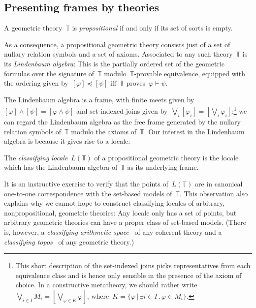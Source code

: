 \documentclass{ws-rv9x6}
\newcommand{\TT}{\mathbb{T}}
\renewcommand{\_}{\mathpunct{.}}
\newcommand{\?}{\,{:}\,}
\begin{document}
\subsection{Presenting frames by theories}
\label{sect:presenting-frames}

\begin{definition}A geometric theory~$\TT$ is \emph{propositional} if and only
if its set of sorts is empty.\end{definition}

As a consequence, a propositional geometric theory consists just of a set of
nullary relation symbols and a set of axioms. Associated to any such
theory~$\TT$ is its \emph{Lindenbaum algebra}: This is the partially ordered
set of the geometric formulas over the signature of~$\TT$ modulo~$\TT$-provable
equivalence, equipped with the ordering given by~$[\varphi] \preceq [\psi]$ iff~$\TT$
proves~$\varphi \vdash \psi$.

The Lindenbaum algebra is a frame, with finite meets given by~$[\varphi] \wedge
[\psi] = [\varphi \wedge \psi]$ and set-indexed joins given by~$\bigvee_i
[\varphi_i] = [\bigvee_i \varphi_i]$;\footnote{This short description of the
set-indexed joins picks representatives from each equivalence class and is
hence only sensible in the presence of the axiom of choice. In a
constructive metatheory, we should rather write~$\bigvee_{i \in I} M_i =
[\bigvee_{\varphi \in K} \varphi]$, where~$K = \{ \varphi \,|\, \exists i \in
I\_ \varphi \in M_i \}$.} we can regard the Lindenbaum algebra as the free
frame generated by the nullary relation symbols of~$\TT$ modulo the axioms
of~$\TT$. Our interest in the Lindenbaum algebra is because it gives rise to a
locale:

\begin{definition}The \emph{classifying locale}~$L(\TT)$ of a propositional
geometric theory is the locale which has the Lindenbaum algebra of~$\TT$ as its
underlying frame.\end{definition}

It is an instructive exercise to verify that the points of~$L(\TT)$ are in
canonical one-to-one correspondence with the set-based models of~$\TT$. This
observation also explains why we cannot hope to construct classifying
locales of arbitrary, nonpropositional, geometric theories: Any locale only has
a set of points, but arbitrary geometric theories can have a proper class of
set-based models. (There is, however, a \emph{classifying arithmetic
space}~\cite{vickers:sketches} of any coherent theory and a \emph{classifying
topos}~\cite[Section~2]{caramello:tst} of any geometric theory.)
\end{document}
